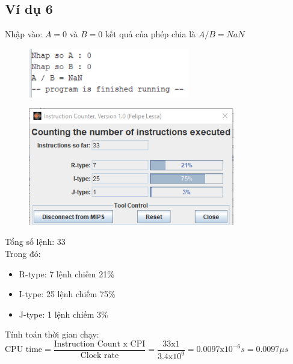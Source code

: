 \documentclass[a4paper]{article}
\begin{document}
\subsection{Ví dụ 6}
Nhập vào: $A = 0$ và $B = 0$ kết quả của phép chia là $A / B = NaN$
\begin{center}
	\begin{figure}[h!]
		\begin{center}
			\includegraphics[width=7cm]{Images/12.png}
		\end{center}
	\end{figure}
\end{center}
\begin{center}
	\begin{figure}[h!]
		\begin{center}
			\includegraphics[width=9cm]{Images/11.png}
		\end{center}
	\end{figure}
\end{center}
Tổng số lệnh: 33\\
Trong đó:
\begin{itemize}
	\item R-type: 7 lệnh chiếm 21\%
	\item I-type: 25 lệnh chiếm 75\%
	\item J-type: 1 lệnh chiếm 3\%
\end{itemize}
Tính toán thời gian chạy:\\
$\text{CPU time} = \dfrac{\text{Instruction Count x CPI}}{\text{Clock rate}} = \dfrac{33\text{x}1}{3.4\text{x}10^9} = 0.0097 \text{x}10^{-6} s = 0.0097 \mu s$
\end{document}
